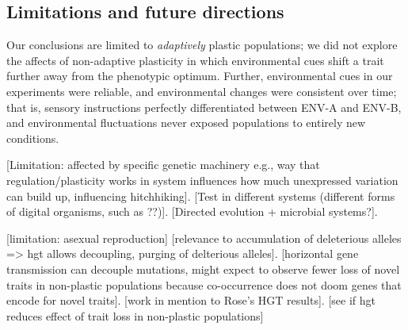 \vspace{0.25cm}
\subsection{Limitations and future directions}

Our conclusions are limited to \textit{adaptively} plastic populations; we did not explore the affects of non-adaptive plasticity in which environmental cues shift a trait further away from the phenotypic optimum.
Further, environmental cues in our experiments were reliable, and environmental changes were consistent over time; that is, sensory instructions perfectly differentiated between ENV-A and ENV-B, and environmental fluctuations never exposed populations to entirely new conditions.

[Limitation: affected by specific genetic machinery e.g., way that regulation/plasticity works in system influences how much unexpressed variation can build up, influencing hitchhiking].
[Test in different systems (different forms of digital organisms, such as ??)].
[Directed evolution + microbial systems?].

[limitation: asexual reproduction]
[relevance to accumulation of deleterious alleles => hgt allows decoupling, purging of delterious alleles].
[horizontal gene transmission can decouple mutations, might expect to observe fewer loss of novel traits in non-plastic populations because co-occurrence does not doom genes that encode for novel traits].
[work in mention to Rose's HGT results].
[see if hgt reduces effect of trait loss in non-plastic populations]





